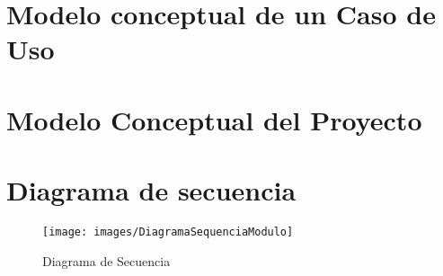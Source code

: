 \section{Modelo conceptual de un Caso de Uso}


\section{Modelo Conceptual del Proyecto}


\section{Diagrama de secuencia}
\begin{landscape}
	\begin{figure}[htbp!]
		\begin{center}
			\texttt{[image: images/DiagramaSequenciaModulo]}
			\caption{Diagrama de Secuencia}
			\label{fig:DSecuendcia}
		\end{center}
	\end{figure}
\end{landscape}
\newpage